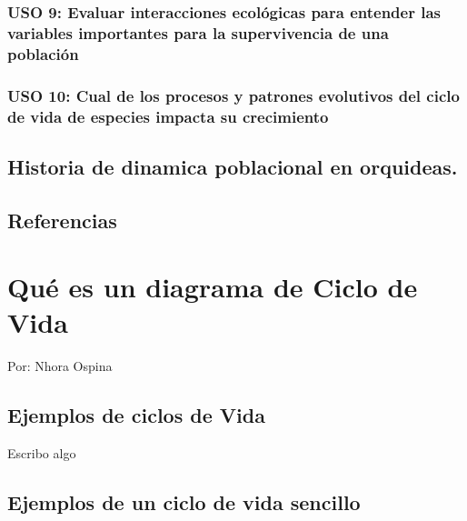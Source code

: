 \documentclass[
]{book}
\theoremstyle{definition}
\theoremstyle{definition}
\theoremstyle{definition}
\theoremstyle{definition}
\theoremstyle{remark}
\begin{document}
\hypertarget{uso-9-evaluar-interacciones-ecoluxf3gicas-para-entender-las-variables-importantes-para-la-supervivencia-de-una-poblaciuxf3n}{%
\subsection{USO 9: Evaluar interacciones ecológicas para entender las variables importantes para la supervivencia de una población}\label{uso-9-evaluar-interacciones-ecoluxf3gicas-para-entender-las-variables-importantes-para-la-supervivencia-de-una-poblaciuxf3n}}

\hypertarget{uso-10-cual-de-los-procesos-y-patrones-evolutivos-del-ciclo-de-vida-de-especies-impacta-su-crecimiento}{%
\subsection{USO 10: Cual de los procesos y patrones evolutivos del ciclo de vida de especies impacta su crecimiento}\label{uso-10-cual-de-los-procesos-y-patrones-evolutivos-del-ciclo-de-vida-de-especies-impacta-su-crecimiento}}

\hypertarget{historia-de-dinamica-poblacional-en-orquideas.}{%
\section{Historia de dinamica poblacional en orquideas.}\label{historia-de-dinamica-poblacional-en-orquideas.}}

\hypertarget{referencias}{%
\section{Referencias}\label{referencias}}

\hypertarget{quuxe9-es-un-diagrama-de-ciclo-de-vida}{%
\chapter{Qué es un diagrama de Ciclo de Vida}\label{quuxe9-es-un-diagrama-de-ciclo-de-vida}}

Por: Nhora Ospina

\hypertarget{ejemplos-de-ciclos-de-vida}{%
\section{Ejemplos de ciclos de Vida}\label{ejemplos-de-ciclos-de-vida}}

Escribo algo

\hypertarget{ejemplos-de-un-ciclo-de-vida-sencillo}{%
\section{Ejemplos de un ciclo de vida sencillo}\label{ejemplos-de-un-ciclo-de-vida-sencillo}}
\end{document}
